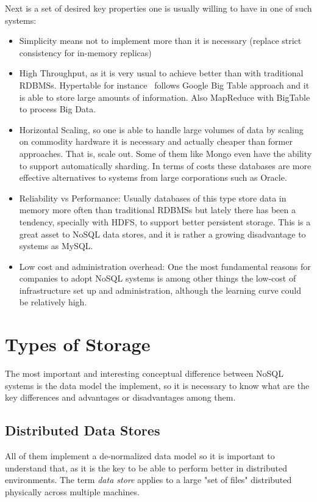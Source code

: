 Next is a set of desired key properties one is usually willing to have in one of such systems:
\begin{itemize}
	\item Simplicity means not to implement more than it is necessary (replace strict consistency for in-memory replicas)
	\item High Throughput, as it is very usual to achieve better than with traditional RDBMSs. Hypertable for instance~\cite{Hypertable} follows Google Big Table\cite{Chang:2006} approach and it is able to store large amounts of information. Also MapReduce with BigTable to process Big Data.
	\item Horizontal Scaling, so one is able to handle large volumes of data by scaling on commodity hardware it is necessary and actually cheaper than former approaches. That is, scale out. Some of them like Mongo even have the ability to support automatically sharding. In terms of costs these databases are more effective alternatives to systems from large corporations such as Oracle.
	\item Reliability vs Performance: Usually databases of this type store data in memory more often than traditional RDBMSs but lately there has been a tendency, specially with HDFS, to support better persistent storage. This is a great asset to NoSQL data stores, and it is rather a growing disadvantage to systems as MySQL.
	\item Low cost and administration overhead: One the most fundamental reasons for companies to adopt NoSQL systems is among other things the low-cost of infrastructure set up and administration, although the learning curve could be relatively high.
\end{itemize}

\section{Types of Storage} %
The most important and interesting conceptual difference between NoSQL systems is the data model the implement, so it is necessary to know what are the key differences and advantages or disadvantages among them.

\subsection{Distributed Data Stores}
All of them implement a de-normalized data model so it is important to understand that, as it is the key to be able to perform better in distributed environments. The term \emph{data store} applies to a large "set of files" distributed physically across multiple machines.
